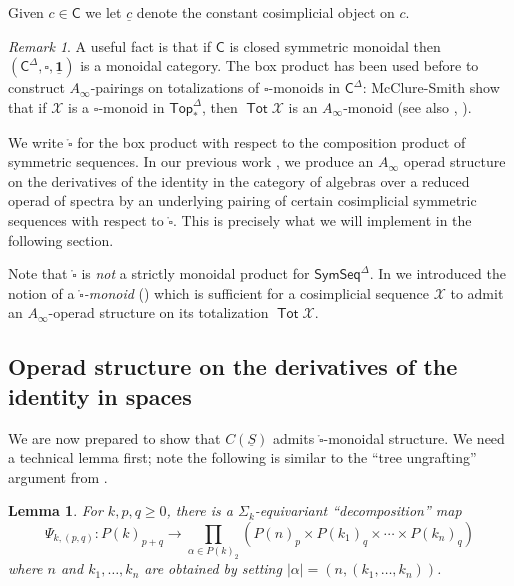 \documentclass[12pt]{amsart}
\newtheorem{lemma}[subsection]{Lemma}
\theoremstyle{definition}
\theoremstyle{remark}
\newtheorem{remark}[subsection]{Remark}
\newcommand{\Top}{\mathsf{Top}_*}
\newcommand{\Tot}{\operatorname{\mathsf{Tot}}}
\newcommand{\SymSeq}{\mathsf{SymSeq}}
\newcommand{\Cal}[1]{\mathcal{#1}}
\newcommand{\boxcirc}{\mathring{\square}}
\newcommand{\uS}{\underline{S}}
\begin{document}
Given $c\in \mathsf{C}$ we let $\underline{c}$ denote the constant cosimplicial object on $c$.

\begin{remark} A useful fact is that if $\mathsf{C}$ is closed symmetric monoidal then $(\mathsf{C}^{\Delta}, \square, \underline{\mathbf{1}})$ is a monoidal category. The box product has been used before to construct $A_{\infty}$-pairings on totalizations of $\square$-monoids in $\mathsf{C}^{\Delta}$: McClure-Smith \cite{MS-box} show that if $\mathcal{X}$ is a $\square$-monoid in $\Top^{\Delta}$, then $\Tot \mathcal{X}$ is an $A_{\infty}$-monoid (see also \cite{AC-2}, \cite{Ching-Harper-Koszul}).\end{remark}

We write $\boxcirc$ for the box product with respect to the composition product of symmetric sequences. In our previous work \cite{Clark-1}, we produce an $A_{\infty}$ operad structure on the derivatives of the identity in the category of algebras over a reduced operad of spectra by an underlying pairing of certain cosimplicial symmetric sequences with respect to $\boxcirc$. This is precisely what we will implement in the following section. 

Note that $\boxcirc$ is \textit{not} a strictly monoidal product for $\SymSeq^{\Delta}$. In \cite{Clark-1} we introduced the notion of a \textit{$\boxcirc$-monoid} (\cite[Definition 5.6]{Clark-1}) which is sufficient for a cosimplicial sequence $\Cal{X}$ to admit an $A_{\infty}$-operad structure on its totalization $\Tot \Cal{X}$.


\subsection{Operad structure on the derivatives of the identity in spaces}

We are now prepared to show that $C(\uS)$ admits $\boxcirc$-monoidal structure. We need a technical lemma first; note the following is similar to the ``tree ungrafting'' argument from \cite{Ching-thesis}. 

\begin{lemma} \label{lem:tech}
    For $k,p,q\geq 0$, there is a $\Sigma_k$-equivariant ``decomposition'' map \[\Psi_{k,(p,q)} \colon P(k)_{p+q}\to \prod_{\alpha\in P(k)_2 } \left( P(n)_p\times  P(k_1)_q\times \cdots \times  P(k_n)_q \right)\]
    where $n$ and $k_1,\dots,k_n$ are obtained by setting $| \alpha |=(n,(k_1,\dots,k_n))$.
\end{lemma}
\end{document}
